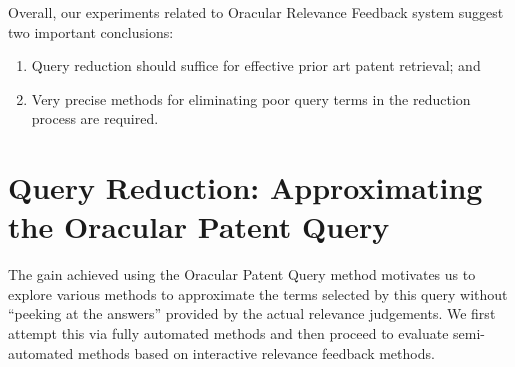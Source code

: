 Overall, our experiments related to Oracular Relevance Feedback system
suggest two important conclusions: 
\begin{enumerate}
\item Query reduction should suffice for effective prior art patent retrieval; and 
\item Very precise methods for eliminating poor query terms in the reduction process are required.
\end{enumerate}

%

\section{Query Reduction: Approximating the Oracular Patent Query}
\label{sec: QR}
The gain achieved using the Oracular Patent Query method motivates us to explore various methods to approximate the terms
selected by this query without ``peeking at the answers'' provided by
the actual relevance judgements.  We first attempt this via fully
automated methods and then proceed to evaluate semi-automated methods
based on interactive relevance feedback methods.
